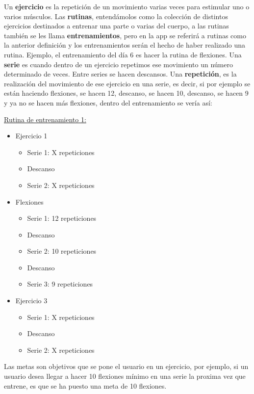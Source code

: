 Un \textbf{ejercicio} es la repetición de un movimiento varias veces para estimular uno o varios músculos. Las \textbf{rutinas}, entendámolos como la colección de distintos ejercicios destinados a entrenar una parte o varias del cuerpo, a las rutinas también se les llama \textbf{entrenamientos}, pero en la app se referirá a rutinas como la anterior definición y los entrenamientos serán el hecho de haber realizado una rutina. Ejemplo, el entrenamiento del día 6 es hacer la rutina de flexiones. Una \textbf{serie} es cuando dentro de un ejercicio repetimos ese movimiento un número determinado de veces. Entre series se hacen descansos. Una \textbf{repetición}, es la realización del movimiento de ese ejercicio en una serie, es decir, si por ejemplo se están haciendo flexiones, se hacen 12, descanso, se hacen 10, descanso, se hacen 9 y ya no se hacen más flexiones, dentro del entrenamiento se vería así:

\underline {Rutina de entrenamiento 1:}
\begin{itemize}
	\item Ejercicio 1
	\begin{itemize}
		\item Serie 1: X repeticiones
		\item Descanso
		\item Serie 2: X repeticiones
	\end{itemize}
	\item Flexiones
	\begin{itemize}
		\item Serie 1: 12 repeticiones
		\item Descanso
		\item Serie 2: 10 repeticiones 
		\item Descanso
		\item Serie 3: 9 repeticiones
	\end{itemize}
	\item Ejercicio 3
	\begin{itemize}
		\item Serie 1: X repeticiones
		\item Descanso
		\item Serie 2: X repeticiones
	\end{itemize}
\end{itemize}

Las metas son objetivos que se pone el usuario en un ejercicio, por ejemplo, si un usuario desea llegar a hacer 10 flexiones mínimo en una serie la proxima vez que entrene, es que se ha puesto una meta de 10 flexiones.

